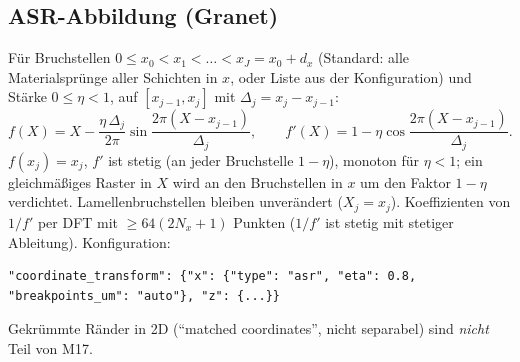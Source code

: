 \subsection{ASR-Abbildung (Granet)}
Für Bruchstellen $0\le x_0<x_1<\dots<x_J=x_0+d_x$ (Standard: alle Materialsprünge aller Schichten in $x$, oder Liste aus
der Konfiguration) und Stärke $0\le\eta<1$, auf $[x_{j-1},x_j]$ mit $\Delta_j=x_j-x_{j-1}$:
\begin{equation}
  f(X)=X-\frac{\eta\,\Delta_j}{2\pi}\sin\frac{2\pi(X-x_{j-1})}{\Delta_j},\qquad
  f'(X)=1-\eta\cos\frac{2\pi(X-x_{j-1})}{\Delta_j}.
  \label{eq:asr}
\end{equation}
$f(x_j)=x_j$, $f'$ ist stetig (an jeder Bruchstelle $1-\eta$), monoton für $\eta<1$; ein gleichmäßiges Raster in $X$ wird an
den Bruchstellen in $x$ um den Faktor $1-\eta$ verdichtet. Lamellenbruchstellen bleiben unverändert ($X_j=x_j$).
Koeffizienten von $1/f'$ per DFT mit $\ge64(2N_x+1)$ Punkten ($1/f'$ ist stetig mit stetiger Ableitung).
Konfiguration:
{\footnotesize\begin{verbatim}
"coordinate_transform": {"x": {"type": "asr", "eta": 0.8, "breakpoints_um": "auto"}, "z": {...}}
\end{verbatim}}
Gekrümmte Ränder in 2D (\enquote{matched coordinates}, nicht separabel) sind \emph{nicht} Teil von M17.

